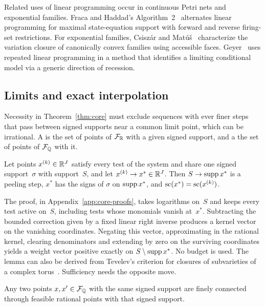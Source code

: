 Related uses of linear programming occur in continuous Petri
nets and exponential families. Fraca and
Haddad's Algorithm~2~\cite{fracahaddad} alternates linear programming for
maximal state-equation support with forward and reverse firing-set
restrictions. For exponential families, Csiszár and
Matúš~\cite{csiszarmatus} characterize the variation closure of canonically
convex families using accessible faces. Geyer~\cite{geyer} uses repeated
linear programming in a method that identifies a limiting conditional model
via a generic direction of recession.

\subsection{Limits and exact interpolation}\label{sec:limits}

Necessity in Theorem~\ref{thm:core} must exclude sequences with ever finer
steps that pass between signed supports near a common limit point, which
can be irrational. A  is the set of points of $\mathcal F_{\mathbb{R}}$
with a given signed support, and a  the set of
points of $\mathcal F_{\mathbb{Q}}$ with it.

\begin{lemma}\label{lem:limit}
Let points $x^{(k)}\in\mathbb{R}^J$ satisfy every test of the system and share one
signed support~$\sigma$ with support~$S$, and let $x^{(k)}\to x^*\in\mathbb{R}^J$.
Then $S\to\operatorname{supp} x^*$ is a peeling step, $x^*$ has the signs of $\sigma$ on
$\operatorname{supp} x^*$, and $\operatorname{sc}(x^*)=\operatorname{sc}(x^{(k)})$.
\end{lemma}

The proof, in Appendix~\ref{app:core-proofs}, takes logarithms on~$S$ and
keeps every test active on~$S$, including tests whose monomials vanish
at~$x^*$. %
Subtracting the bounded correction given by a fixed linear right inverse
produces a kernel vector on the vanishing coordinates. Negating this vector,
approximating in the rational kernel, clearing denominators and extending
by zero on the surviving coordinates yields a weight vector positive
exactly on $S\setminus\operatorname{supp} x^*$. No budget is used. The lemma can also be derived from Tevelev's criterion for
closures of subvarieties of a complex torus~\cite[Lemma~2.2]{tevelev}.
Sufficiency needs the opposite move.

\begin{lemma}\label{lem:interpolation}
Any two points $x,x'\in\mathcal F_{\mathbb{Q}}$ with the same signed support are finely
connected through feasible rational points with that signed support.
\end{lemma}


